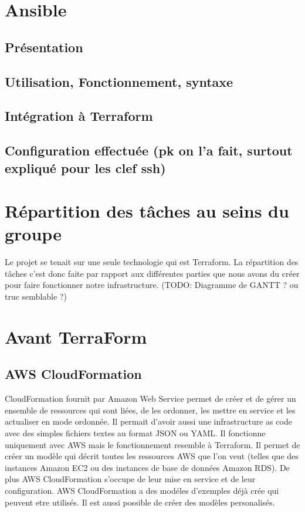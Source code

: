 \documentclass[]{article}
\begin{document}
\section{Ansible}\label{ansible}

\subsection{Présentation}\label{pruxe9sentation}

\subsection{Utilisation, Fonctionnement,
syntaxe}\label{utilisation-fonctionnement-syntaxe}

\subsection{Intégration à
Terraform}\label{intuxe9gration-uxe0-terraform}

\subsection{Configuration effectuée (pk on l'a fait, surtout expliqué
pour les clef
ssh)}\label{configuration-effectuuxe9e-pk-on-la-fait-surtout-expliquuxe9-pour-les-clef-ssh}

\section{Répartition des tâches au seins du
groupe}\label{ruxe9partition-des-tuxe2ches-au-seins-du-groupe}

Le projet se tenait sur une seule technologie qui est Terraform. La
répartition des tâches c'est donc faite par rapport aux différentes
parties que nous avons du créer pour faire fonctionner notre
infrastructure. (TODO: Diagramme de GANTT ? ou truc semblable ?)

\section{Avant TerraForm}\label{avant-terraform}

\subsection{AWS CloudFormation}\label{aws-cloudformation}

CloudFormation fournit par Amazon Web Service permet de créer et de
gérer un ensemble de ressources qui sont liées, de les ordonner, les
mettre en service et les actualiser en mode ordonnée. Il permait d'avoir
aussi une infrastructure as code avec des simples fichiers textes au
format JSON ou YAML. Il fonctionne uniquement avec AWS mais le
fonctionnement resemble à Terraform. Il permet de créer un modèle qui
décrit toutes les ressources AWS que l'on veut (telles que des instances
Amazon EC2 ou des instances de base de données Amazon RDS). De plus AWS
CloudFormation s'occupe de leur mise en service et de leur
configuration. AWS CloudFormation a des modéles d'exemples déjà crée qui
peuvent etre utilisés. Il est aussi possible de créer des modèles
personalisés.
\end{document}
